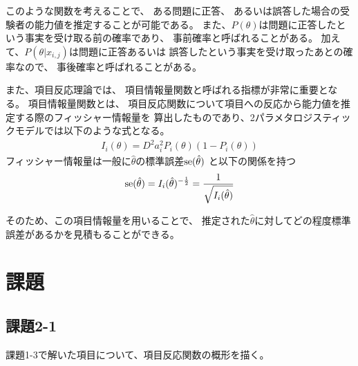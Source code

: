 \documentclass[12pt]{jarticle}
\begin{document}
このような関数を考えることで、
ある問題に正答、
あるいは誤答した場合の受験者の能力値を推定することが可能である。
また、$P(\theta)$は問題に正答したという事実を受け取る前の確率であり、
事前確率と呼ばれることがある。
加えて、$P(\theta|x_{i,j})$は問題に正答あるいは
誤答したという事実を受け取ったあとの確率なので、
事後確率と呼ばれることがある。

また、項目反応理論では、
項目情報量関数と呼ばれる指標が非常に重要となる。
項目情報量関数とは、
項目反応関数について項目への反応から能力値を推定する際のフィッシャー情報量を
算出したものであり、2パラメタロジスティックモデルでは以下のような式となる。
\begin{eqnarray}
    I_i(\theta)=D^2a_i^2 P_i(\theta)(1-P_i(\theta))
\end{eqnarray}
フィッシャー情報量は一般に$\hat{\theta}$の標準誤差${\rm se}(\hat{\theta})$
と以下の関係を持つ
\begin{eqnarray}
    {\rm se}(\hat{\theta})=I_i(\hat{\theta})^{-\frac{1}{2}}=\frac{1}{\sqrt{I_i(\hat{\theta})}}
\end{eqnarray}

そのため、この項目情報量を用いることで、
推定された$\hat{\theta}$に対してどの程度標準誤差があるかを見積もることができる。

\clearpage
\section{課題}
\subsection{課題2-1}
\begin{shadebox}
    課題1-3で解いた項目について、項目反応関数の概形を描く。
\end{shadebox}
\end{document}
